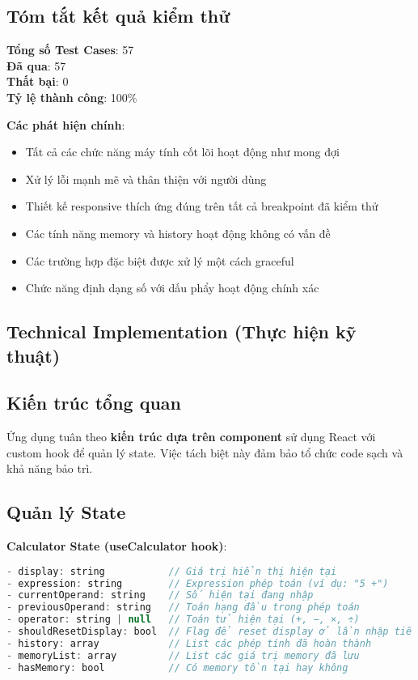 \subsection{Tóm tắt kết quả kiểm thử}

\textbf{Tổng số Test Cases}: 57 \\
\textbf{Đã qua}: 57 \\
\textbf{Thất bại}: 0 \\
\textbf{Tỷ lệ thành công}: 100\%

\textbf{Các phát hiện chính}:
\begin{itemize}
    \item Tất cả các chức năng máy tính cốt lõi hoạt động như mong đợi
    \item Xử lý lỗi mạnh mẽ và thân thiện với người dùng
    \item Thiết kế responsive thích ứng đúng trên tất cả breakpoint đã kiểm thử
    \item Các tính năng memory và history hoạt động không có vấn đề
    \item Các trường hợp đặc biệt được xử lý một cách graceful
    \item Chức năng định dạng số với dấu phẩy hoạt động chính xác
\end{itemize}

\subsection{Technical Implementation (Thực hiện kỹ thuật)}

\subsection{Kiến trúc tổng quan}

Ứng dụng tuân theo \textbf{kiến trúc dựa trên component} sử dụng React với custom hook để quản lý state. Việc tách biệt này đảm bảo tổ chức code sạch và khả năng bảo trì.

\subsection{Quản lý State}

\textbf{Calculator State (useCalculator hook)}:

\begin{lstlisting}[language=JavaScript, caption=Cấu trúc State]
- display: string           // Giá trị hiển thị hiện tại
- expression: string        // Expression phép toán (ví dụ: "5 +")
- currentOperand: string    // Số hiện tại đang nhập
- previousOperand: string   // Toán hạng đầu trong phép toán
- operator: string | null   // Toán tử hiện tại (+, −, ×, ÷)
- shouldResetDisplay: bool  // Flag để reset display ở lần nhập tiếp
- history: array            // List các phép tính đã hoàn thành
- memoryList: array         // List các giá trị memory đã lưu
- hasMemory: bool           // Có memory tồn tại hay không
\end{lstlisting}

